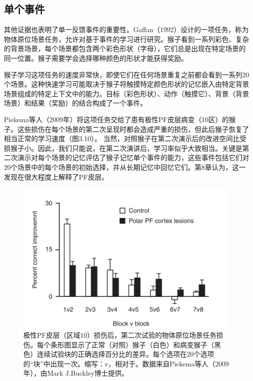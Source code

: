 \subsection{单个事件}
其他证据也表明了单一反馈事件的重要性。Gaffan（1992）设计的一项任务，称为物体原位场景任务，允许对基于事件的学习进行研究。猴子看到一系列彩色、复杂的背景场景，每个场景都包含两个彩色形状（字母），它们总是出现在特定场景的同一位置。猴子需要学会选择哪种颜色的形状才能获得奖励。\par
猴子学习这项任务的速度非常快，即使它们在任何场景重复之前都会看到一系列20个场景。这种快速学习可能取决于猴子将触摸特定颜色形状的记忆嵌入由特定背景场景组成的特定上下文中的能力。目标（彩色形状）、动作（触摸它）、背景（背景场景）和结果（奖励）的结合构成了一个事件。\par
Piekema等人（2009年）将这项任务交给了患有极性PF皮层病变（10区）的猴子。这些损伤在每个场景的第二次呈现时都会造成严重的损伤，但此后猴子恢复了相当正常的学习速度（图3.10）。
当然，对照猴子在第二次演示后的改进空间比受损猴子小。因此，我们只能说，在第二次演讲后，学习率似乎大致相当。关键是第二次演示对每个场景的记忆评估了猴子记忆单个事件的能力，这些事件包括它们对20个场景中的每个场景的初始选择，并从长期记忆中回忆它们。第8章认为，这一发现在很大程度上解释了PF皮层。\par
\begin{figure}[!htb]
	\centering
	\includegraphics{image_pfc/Fig_3_10}
	\caption{极性PF皮层（区域10）损伤后，第二次试验的物体原位场景任务损伤。每个条形图显示了正常（对照）猴子（白色）和病变猴子（黑色）连续试验块的正确选择百分比的差异。每个选项在20个选项的“块”中出现一次。缩写：v，相对于。数据来自Piekema等人（2009年），由Mark J.Buckley博士提供。}
	\label{fig:fig}
\end{figure}
